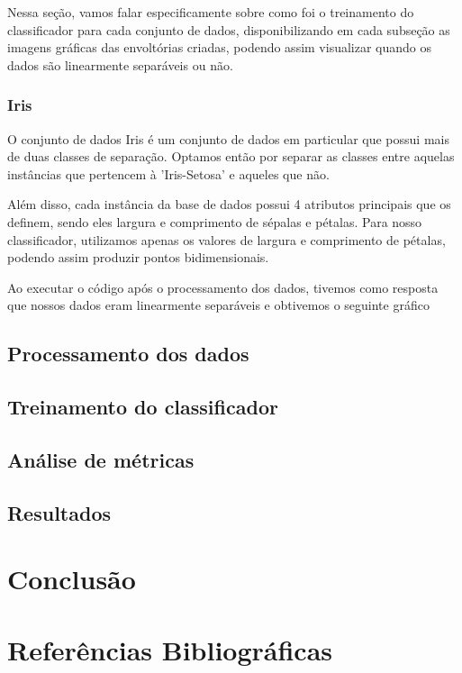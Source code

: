 \documentclass{article}
\begin{document}
Nessa seção, vamos falar especificamente sobre como foi o treinamento do classificador para cada conjunto de dados, disponibilizando em cada subseção as imagens gráficas das envoltórias criadas, podendo assim visualizar quando os dados são linearmente separáveis ou não.

\subsubsection{Iris}

O conjunto de dados Iris é um conjunto de dados em particular que possui mais de duas classes de separação. Optamos então por separar as classes entre aquelas instâncias que pertencem à 'Iris-Setosa' e aqueles que não. 

Além disso, cada instância da base de dados possui 4 atributos principais que os definem, sendo eles largura e comprimento de sépalas e pétalas. Para nosso classificador, utilizamos apenas os valores de largura e comprimento de pétalas, podendo assim produzir pontos bidimensionais.

Ao executar o código após o processamento dos dados, tivemos como resposta que nossos dados eram linearmente separáveis e obtivemos o seguinte gráfico

\subsection{Processamento dos dados}

\subsection{Treinamento do classificador}

\subsection{Análise de métricas}

\subsection{Resultados}

\section{Conclusão}

\section{Referências Bibliográficas}
\end{document}
